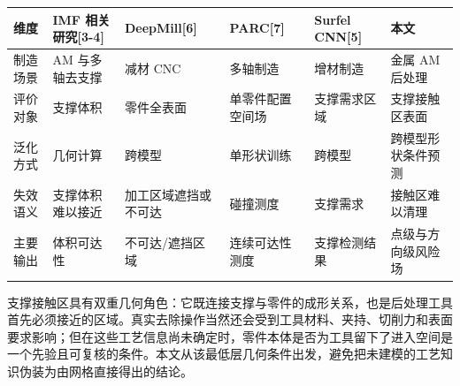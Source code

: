 {\def\LTcaptype{none} %
\begin{longtable}[]{@{}
  >{\raggedright\arraybackslash}p{}
  >{\raggedright\arraybackslash}p{}
  >{\raggedright\arraybackslash}p{}
  >{\raggedright\arraybackslash}p{}
  >{\raggedright\arraybackslash}p{}
  >{\raggedright\arraybackslash}p{}@{}}
\toprule\noalign{}
\begin{minipage}[b]{\linewidth}\raggedright
维度
\end{minipage} & \begin{minipage}[b]{\linewidth}\raggedright
IMF 相关研究{[}3-4{]}
\end{minipage} & \begin{minipage}[b]{\linewidth}\raggedright
DeepMill{[}6{]}
\end{minipage} & \begin{minipage}[b]{\linewidth}\raggedright
PARC{[}7{]}
\end{minipage} & \begin{minipage}[b]{\linewidth}\raggedright
Surfel CNN{[}5{]}
\end{minipage} & \begin{minipage}[b]{\linewidth}\raggedright
本文
\end{minipage} \\
\midrule\noalign{}
\endhead
\bottomrule\noalign{}
\endlastfoot
制造场景 & AM 与多轴去支撑 & 减材 CNC & 多轴制造 & 增材制造 & 金属 AM 后处理 \\
评价对象 & 支撑体积 & 零件全表面 & 单零件配置空间场 & 支撑需求区域 & 支撑接触区表面 \\
泛化方式 & 几何计算 & 跨模型 & 单形状训练 & 跨模型 & 跨模型形状条件预测 \\
失效语义 & 支撑体积难以接近 & 加工区域遮挡或不可达 & 碰撞测度 & 支撑需求 & 接触区难以清理 \\
主要输出 & 体积可达性 & 不可达/遮挡区域 & 连续可达性测度 & 支撑检测结果 & 点级与方向级风险场 \\
\end{longtable}
}

支撑接触区具有双重几何角色：它既连接支撑与零件的成形关系，也是后处理工具首先必须接近的区域。真实去除操作当然还会受到工具材料、夹持、切削力和表面要求影响；但在这些工艺信息尚未确定时，零件本体是否为工具留下了进入空间是一个先验且可复核的条件。本文从该最低层几何条件出发，避免把未建模的工艺知识伪装为由网格直接得出的结论。

